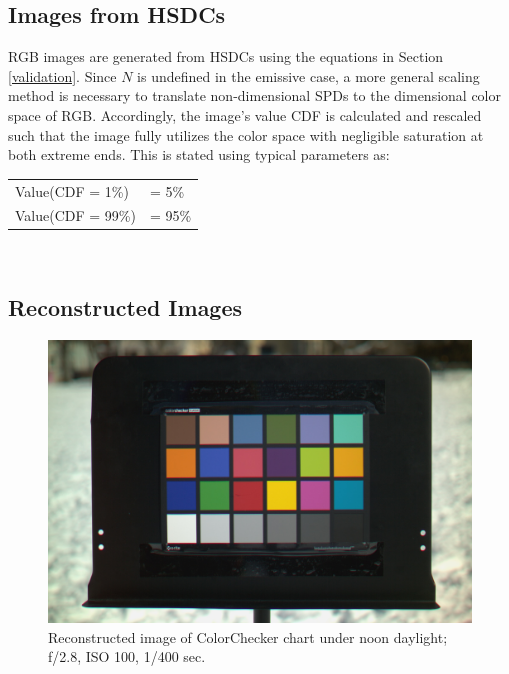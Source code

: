 \documentclass[twocolumn,10pt]{asme2ej}
\begin{document}
\subsection{Images from HSDCs}

RGB images are generated from HSDCs using the equations in Section \ref{validation}. Since $N$ is undefined in the emissive case, a more general scaling method is necessary to translate non-dimensional SPDs to the dimensional color space of RGB. Accordingly, the image's value CDF is calculated and rescaled such that the image fully utilizes the color space with negligible saturation at both extreme ends. This is stated using typical parameters as:\\

\begin{tabular}{l l}
Value(CDF = 1\%) & = 5\%\\
Value(CDF = 99\%) & = 95\%\\
\end{tabular}\\

\clearpage

\onecolumn

\subsection{Reconstructed Images}

\begin{figure}[H]
\begin{centering}
  \includegraphics[height=0.55\linewidth]{colorchecker.jpg}
  \caption{Reconstructed image of ColorChecker chart under noon daylight; f/2.8, ISO 100, 1/400 sec.}
  \label{colorchecker_mesh}
  \end{centering}
\end{figure}
\end{document}
